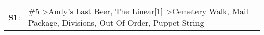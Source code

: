 \begin{supertabular}{p{0.03\textwidth}p{0.92\textwidth}}
 \textbf{S1}:  &  \#5\textsuperscript{} \textgreater \enspace Andy's Last Beer\textsuperscript{}, \enspace The Linear[1]\textsuperscript{} \textgreater \enspace Cemetery Walk\textsuperscript{}, \enspace Mail Package\textsuperscript{}, \enspace Divisions\textsuperscript{}, \enspace Out Of Order\textsuperscript{}, \enspace Puppet String\textsuperscript{}  \enspace  \\
\end{supertabular}
